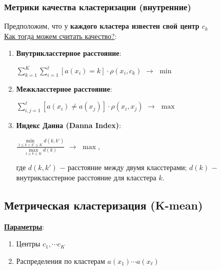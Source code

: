         \subsubsection{Метрики качества кластеризации (внутренние)}
            Предположим, что у \textbf{каждого кластера известен свой центр $c_k$}\\

            \underline{Как тогда можем считать качество?}:
            \begin{enumerate}
                \item \textbf{Внутрикласстерное расстояние}:\\
                    \begin{center}
                    \large
                        $\sum\limits_{k = 1}^K\sum\limits_{i = 1}^\ell[a(x_i) = k]\cdot\rho(x_i, c_k)$ $\longrightarrow$ $\min$
                    \end{center}

                \item \textbf{Межкласстерное расстояние}:\\
                    \begin{center}
                    \large
                        $\sum\limits_{i, j = 1}^\ell[a(x_i) \neq a(x_j)]\cdot\rho(x_i, x_j)$ $\longrightarrow$ $\max$
                    \end{center}

                \item \textbf{Индекс Данна (Danna Index)}:\\

                    \begin{center}
                    \Large
                        $\frac{\min\limits_{1 \leq k < k' \leq K }d(k, k')}{\max\limits_{1 \leq k \leq K}d(k)}$ $\longrightarrow$ $\max$,
                    \end{center}
                    где $d(k, k')$ $-$ расстояние между двумя класстерами; \quad $d(k)$ $-$ внутрикласстерное расстояние для класстера $k$.
            \end{enumerate}

    \subsection{Метрическая кластеризация (K-mean)}
        \textbf{\underline{Параметры}}:
        \begin{enumerate}
            \item Центры $c_1, \cdots c_K$

            \item Распределения по кластерам $a(x_1) \cdots a(x_\ell)$
        \end{enumerate}

